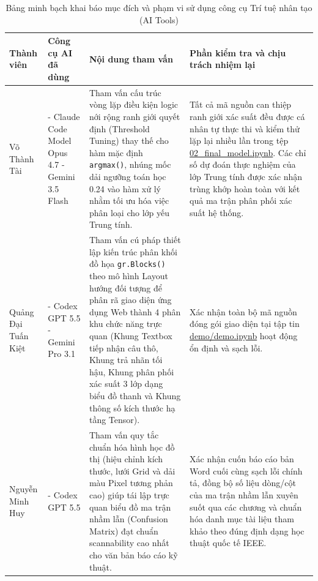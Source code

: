 \documentclass[conference,10pt,a4paper]{IEEEtran}
\begin{document}
\begin{table}[t]
\centering
\caption{Bảng minh bạch khai báo mục đích và phạm vi sử dụng công cụ Trí tuệ nhân tạo (AI Tools)}
\vspace{0.15cm}
\small
\renewcommand{\arraystretch}{1.3}
\begin{tabularx}{\textwidth}{|>{\centering\arraybackslash}p{2.5cm}|>{\centering\arraybackslash}p{3.2cm}|X|X|}
\hline
\textbf{Thành viên} & \textbf{Công cụ AI đã dùng} & \textbf{Nội dung tham vấn} & \textbf{Phần kiểm tra và chịu trách nhiệm lại} \\
\hline
Võ Thành Tài & 
- Claude Code Model Opus 4.7 \newline 
- Gemini 3.5 Flash & 
Tham vấn cấu trúc vòng lặp điều kiện logic nới rộng ranh giới quyết định (Threshold Tuning) thay thế cho hàm mặc định \texttt{argmax()}, nhúng mốc dải ngưỡng toán học 0.24 vào hàm xử lý nhằm tối ưu hóa việc phân loại cho lớp yếu Trung tính. & 
Tất cả mã nguồn can thiệp ranh giới xác suất đều được cá nhân tự thực thi và kiểm thử lặp lại nhiều lần trong tệp \url{02_final_model.ipynb}. Các chỉ số dự đoán thực nghiệm của lớp Trung tính được xác nhận trùng khớp hoàn toàn với kết quả ma trận phân phối xác suất hệ thống. \\
\hline
Quảng Đại Tuấn Kiệt & 
- Codex GPT 5.5 \newline 
- Gemini Pro 3.1 &
Tham vấn cú pháp thiết lập kiến trúc phân khối đồ họa \texttt{gr.Blocks()} theo mô hình Layout hướng đối tượng để phân rã giao diện ứng dụng Web thành 4 phân khu chức năng trực quan (Khung Textbox tiếp nhận câu thô, Khung trả nhãn tối hậu, Khung phân phối xác suất 3 lớp dạng biểu đồ thanh và Khung thông số kích thước hạ tầng Tensor). & 
Xác nhận toàn bộ mã nguồn đóng gói giao diện tại tập tin \url{demo/demo.ipynb} hoạt động ổn định và sạch lỗi. \\
\hline
Nguyễn Minh Huy & 
- Codex GPT 5.5 & 
Tham vấn quy tắc chuẩn hóa hình học đồ thị (hiệu chỉnh kích thước, lưới Grid và dải màu Pixel tương phản cao) giúp tái lập trực quan biểu đồ ma trận nhầm lẫn (Confusion Matrix) đạt chuẩn scannability cao nhất cho văn bản báo cáo kỹ thuật. & 
Xác nhận cuốn báo cáo bản Word cuối cùng sạch lỗi chính tả, đồng bộ số liệu dòng/cột của ma trận nhầm lẫn xuyên suốt qua các chương và chuẩn hóa danh mục tài liệu tham khảo theo đúng định dạng học thuật quốc tế IEEE. \\
\hline
\end{tabularx}
\end{table}
\end{document}
